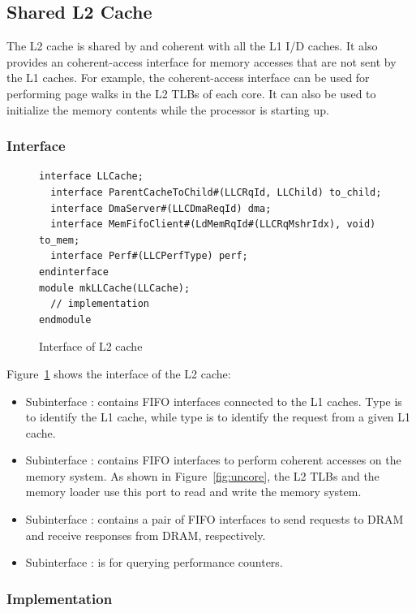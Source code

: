 \subsection{Shared L2 Cache}
The L2 cache is shared by and coherent with all the L1 I/D caches.
It also provides an coherent-access interface for memory accesses that are not sent by the L1 caches.
For example, the coherent-access interface can be used for performing page walks in the L2 TLBs of each core.
It can also be used to initialize the memory contents while the processor is starting up.

\subsubsection{Interface}

\begin{figure}
\begin{lstlisting}[caption={}]
interface LLCache;
  interface ParentCacheToChild#(LLCRqId, LLChild) to_child;
  interface DmaServer#(LLCDmaReqId) dma;
  interface MemFifoClient#(LdMemRqId#(LLCRqMshrIdx), void) to_mem;
  interface Perf#(LLCPerfType) perf;
endinterface
module mkLLCache(LLCache);
  // implementation
endmodule
\end{lstlisting}
\caption{Interface of L2 cache}\label{fig:l2-cache-ifc}
\end{figure}

Figure~\ref{fig:l2-cache-ifc} shows the interface of the L2 cache:
\begin{itemize}
    \item Subinterface : contains FIFO interfaces connected to the L1 caches.
    Type  is to identify the L1 cache, while type  is to identify the request from a given L1 cache.
    \item Subinterface : contains FIFO interfaces to perform coherent accesses on the memory system.
    As shown in Figure~\ref{fig:uncore}, the L2 TLBs and the memory loader use this port to read and write the memory system.
    \item Subinterface : contains a pair of FIFO interfaces to send requests to DRAM and receive responses from DRAM, respectively.
    \item Subinterface : is for querying performance counters. 
\end{itemize}

\subsubsection{Implementation}

